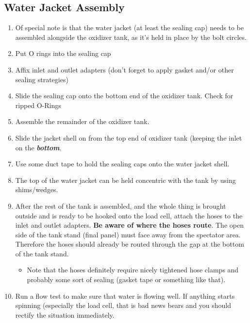 \documentclass[11pt]{article}
\begin{document}
\subsection{Water Jacket Assembly}

\begin{enumerate}
	\item Of special note is that the water jacket (at least the sealing cap) needs to be assembled alongside the oxidizer tank, as it's held in place by the bolt circles.
	\item Put O rings into the sealing cap
	\item Affix inlet and outlet adapters (don't forget to apply gasket and/or other sealing strategies)
	\item Slide the sealing cap onto the bottom end of the oxidizer tank. Check for ripped O-Rings
	\item Assemble the remainder of the oxidizer tank.
	\item Slide the jacket shell on from the top end of oxidizer tank (keeping the inlet on the \textbf{\textit{bottom}}.
	\item Use some duct tape to hold the sealing caps onto the water jacket shell.
	\item The top of the water jacket can be held concentric with the tank by using shims/wedges.
	\item After the rest of the tank is assembled, and the whole thing is brought outside and is ready to be hooked onto the load cell, attach the hoses to the inlet and outlet adapters. \textbf{Be aware of where the hoses route}. The open side of the tank stand (final panel) must face away from the spectator area. Therefore the hoses should already be routed through the gap at the bottom of the tank stand.
		\begin{itemize}
			\item Note that the hoses definitely require nicely tightened hose clamps and probably some sort of sealing (gasket tape or something like that).
		\end{itemize}
	\item Run a flow test to make sure that water is flowing well. If anything starts spinning (especially the load cell, that is bad news bears and you should rectify the situation immediately.
\end{enumerate}
\end{document}
